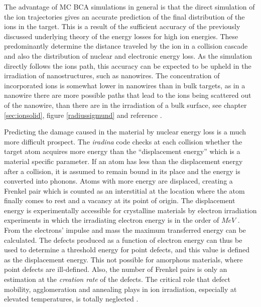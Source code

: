 The advantage of MC BCA simulations in general is that the direct simulation of the ion trajectories gives an accurate prediction of the final distribution of the ions in the target. This is a result of the sufficient accuracy of the previously discussed underlying theory of the energy losses for high ion energies. These predominantly determine the distance traveled by the ion in a collision cascade and also the distribution of nuclear and electronic energy loss. As the simulation directly follows the ions path, this accuracy can be expected to be upheld in the irradiation of nanostructures, such as nanowires. The concentration of incorporated ions is somewhat lower in nanowires than in bulk targets, as in a nanowire there are more possible paths that lead to the ions being scattered out of the nanowire, than there are in the irradiation of a bulk surface, see chapter \ref{sec:ionsolid}, figure \ref{radiussigmund} and reference \cite{borschel_ion-solid_2012}. 

Predicting the damage caused in the material by nuclear energy loss is a much more difficult prospect. The \emph{iradina} code checks at each collision whether the target atom acquires more energy than the ``displacement energy'' which is a material specific parameter. If an atom has less than the displacement energy after a collision, it is assumed to remain bound in its place and the energy is converted into phonons. Atoms with more energy are displaced, creating a Frenkel pair which is counted as an interstitial at the location where the atom finally comes to rest and a vacancy at its point of origin. The displacement energy is experimentally accessible for crystalline materials by electron irradiation experiments in which the irradiating electron energy is in the order of $MeV$ \cite{corbett_production_1965}. From the electrons' impulse and mass the maximum transferred energy can be calculated. The defects produced as a function of electron energy can thus be used to determine a threshold energy for point defects, and this value is defined as the displacement energy. This not possible for amorphous materials, where point defects are ill-defined. Also, the number of Frenkel pairs is only an estimation at the \emph{creation rate} of the defects. The critical role that defect mobility, agglomeration and annealing plays in ion irradiation, especially at elevated temperatures, is totally neglected \cite{pelaz_ion-beam-induced_2004,nordlund_correction_2014}.

